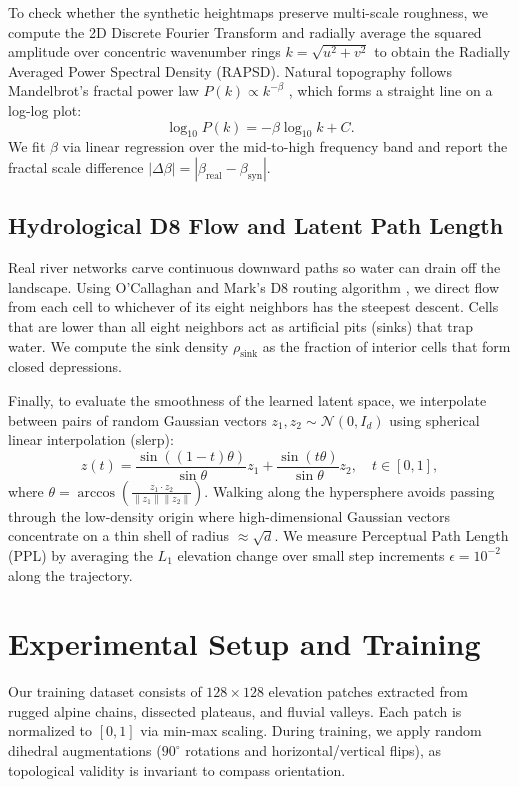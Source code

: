 \documentclass[conference]{IEEEtran}
\begin{document}
To check whether the synthetic heightmaps preserve multi-scale roughness, we compute the 2D Discrete Fourier Transform and radially average the squared amplitude over concentric wavenumber rings $k = \sqrt{u^2 + v^2}$ to obtain the Radially Averaged Power Spectral Density (RAPSD). Natural topography follows Mandelbrot's fractal power law $P(k) \propto k^{-\beta}$ \cite{b18}, which forms a straight line on a log-log plot:
\begin{equation}
\log_{10} P(k) = -\beta \log_{10} k + C. \label{eq:rapsd}
\end{equation}
We fit $\beta$ via linear regression over the mid-to-high frequency band and report the fractal scale difference $|\Delta \beta| = |\beta_{\text{real}} - \beta_{\text{syn}}|$.

\subsection{Hydrological D8 Flow and Latent Path Length}
Real river networks carve continuous downward paths so water can drain off the landscape. Using O'Callaghan and Mark's D8 routing algorithm \cite{b16}, we direct flow from each cell to whichever of its eight neighbors has the steepest descent. Cells that are lower than all eight neighbors act as artificial pits (sinks) that trap water. We compute the sink density $\rho_{\text{sink}}$ as the fraction of interior cells that form closed depressions.

Finally, to evaluate the smoothness of the learned latent space, we interpolate between pairs of random Gaussian vectors $z_1, z_2 \sim \mathcal{N}(0, I_d)$ using spherical linear interpolation (slerp):
\begin{equation}
z(t) = \frac{\sin((1-t)\theta)}{\sin \theta} z_1 + \frac{\sin(t\theta)}{\sin \theta} z_2, \quad t \in [0, 1], \label{eq:slerp}
\end{equation}
where $\theta = \arccos\left(\frac{z_1 \cdot z_2}{\|z_1\| \|z_2\|}\right)$. Walking along the hypersphere avoids passing through the low-density origin where high-dimensional Gaussian vectors concentrate on a thin shell of radius $\approx \sqrt{d}$. We measure Perceptual Path Length (PPL) by averaging the $L_1$ elevation change over small step increments $\epsilon = 10^{-2}$ along the trajectory.

\section{Experimental Setup and Training}
Our training dataset consists of $128\times 128$ elevation patches extracted from rugged alpine chains, dissected plateaus, and fluvial valleys. Each patch is normalized to $[0, 1]$ via min-max scaling. During training, we apply random dihedral augmentations ($90^\circ$ rotations and horizontal/vertical flips), as topological validity is invariant to compass orientation.
\end{document}
